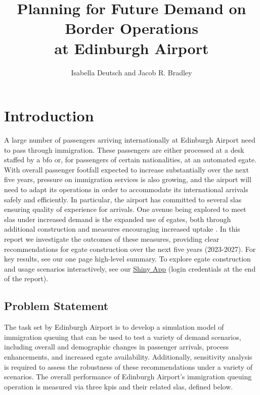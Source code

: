 \documentclass[10pt]{article}
\title{Planning for Future Demand on Border Operations\\ at Edinburgh Airport}
\author{Isabella Deutsch and Jacob R. Bradley}
\date{}
\begin{document}
\pagestyle{fancy}
\maketitle

\section{Introduction}
A large number of passengers arriving internationally at Edinburgh Airport need to pass through immigration. These passengers are either processed at a desk staffed by a \gls{bfo} or, for passengers of certain nationalities, at an automated \gls{egate}. With overall passenger footfall expected to increase substantially over the next five years, pressure on immigration services is also growing, and the airport will need to adapt its operations in order to accommodate its international arrivals safely and efficiently. In particular, the airport has committed to several \glspl{sla} ensuring quality of experience for arrivals. One avenue being explored to meet \glspl{sla} under increased demand is the expanded use of \glspl{egate}, both through additional construction and measures encouraging increased uptake \cite{UK_border_2025}. In this report we investigate the outcomes of these measures, providing clear recommendations for \gls{egate} construction over the next five years (2023-2027). For key results, see our one page high-level summary. To explore \gls{egate} construction and usage scenarios interactively, see our \href{https://jacob-bradley.shinyapps.io/shiny/}{Shiny App} (login credentials at the end of the report).

\subsection{Problem Statement}
The task set by Edinburgh Airport is to develop a simulation model of immigration queuing that can be used to test a variety of demand scenarios, including overall and demographic changes in passenger arrivals, process enhancements, and increased \gls{egate} availability. 
Additionally, sensitivity analysis is required to assess the robustness of these recommendations under a variety of scenarios.
The overall performance of Edinburgh Airport's immigration queuing operation is measured via three \glspl{kpi} and their related \glspl{sla}, defined below.
\end{document}
